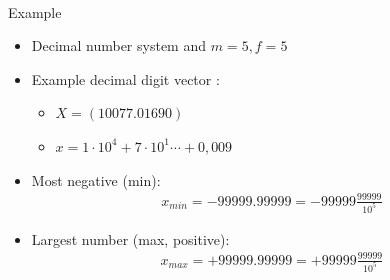 \
\begin{parag}{Example}
    \begin{itemize}
        \item Decimal number system and $m = 5, f = 5$
        \item Example decimal digit vector : 
            \begin{itemize}
                \item $X = (10077.01690)$
                \item $ x = 1 \cdot 10^4 + 7 \cdot 10^1 \cdots  + 0,009$
            \end{itemize}
        \item Most negative (min):
            \begin{align*}
                x_{min} = -99999.99999 = -99999 \frac{99999}{10^5}
            \end{align*}
            
        \item Largest number (max, positive):
            \begin{align*}
                x_{max} = +99999.99999 = +99999 \frac{99999}{10^5}
            \end{align*}

            
    \end{itemize}
    
\end{parag}



